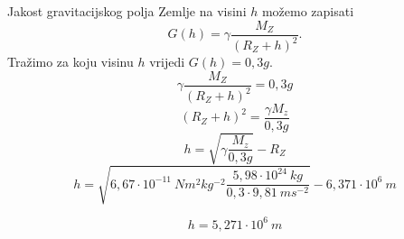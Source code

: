 

Jakost gravitacijskog polja Zemlje na visini $h$ možemo zapisati
$$ G(h)= \gamma\frac{M_Z}{(R_Z+h)^2} . $$
Tražimo za koju visinu $h$ vrijedi $G(h)=0,3g.$
$$ \gamma\frac{M_Z}{(R_Z+h)^2} = 0,3g$$
$$ (R_Z+h)^2 = \frac{\gamma M_z}{0,3g} $$
$$ h = \sqrt{\gamma  \frac{M_z}{0,3g}}  - R_Z $$
$$ h = \sqrt{ 6,67\cdot  10^{-11}\ Nm^2kg^{-2}  \frac{ 5,98 \cdot  10^{24}\ kg }{0,3\cdot 9,81\ ms^{-2}} }  
- 6,371\cdot  10^6\ m$$

$$ h= 5,271\cdot 10^6\ m $$
